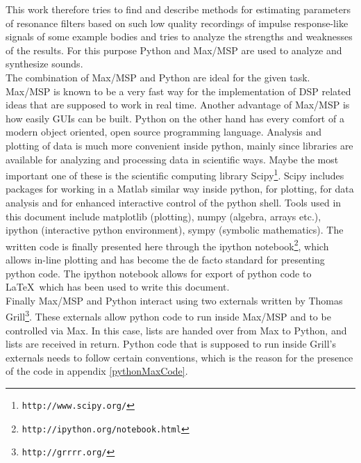 This work therefore tries to find and describe methods for estimating parameters of resonance filters based on such low quality recordings of impulse response-like signals of some example bodies and tries to analyze the strengths and weaknesses of the results. For this purpose Python and Max/MSP are used to analyze and synthesize sounds.\\
The combination of Max/MSP and Python are ideal for the given task. Max/MSP is known to be a very fast way for the implementation of DSP related ideas that are supposed to work in real time. Another advantage of Max/MSP is how easily GUIs can be built. Python on the other hand has every comfort of a modern object oriented, open source programming language. Analysis and plotting of data is much more convenient inside python, mainly since libraries are available for analyzing and processing data in scientific ways. Maybe the most important one of these is the scientific computing library Scipy\footnote{\texttt{http://www.scipy.org/}}. Scipy includes packages for working in a Matlab similar way inside python, for plotting, for data analysis and for enhanced interactive control of the python shell. Tools used in this document include matplotlib (plotting), numpy (algebra, arrays etc.), ipython (interactive python environment), sympy (symbolic mathematics). The written code is finally presented here through the ipython notebook\footnote{\texttt{http://ipython.org/notebook.html}}, which allows in-line plotting and has become the de facto standard for presenting python code. The ipython notebook allows for export of python code to \LaTeX \ which has been used to write this document.\\
Finally Max/MSP and Python interact using two externals written by Thomas Grill\footnote{\texttt{http://grrrr.org/}}. These externals allow python code to run inside Max/MSP and to be controlled via Max. In this case, lists are handed over from Max to Python, and lists are received in return. Python code that is supposed to run inside Grill's externals needs to follow certain conventions, which is the reason for the presence of the code in appendix \ref{pythonMaxCode}.



